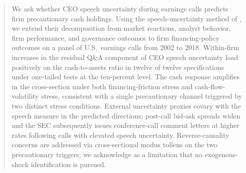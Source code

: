
\begin{abstract}
\noindent
We ask whether CEO speech uncertainty during earnings calls predicts firm precautionary cash holdings. Using the speech-uncertainty method of , we extend their decomposition from market reactions, analyst behavior, firm performance, and governance outcomes to firm financing-policy outcomes on a panel of U.S.\ earnings calls from 2002 to 2018. Within-firm increases in the residual Q\&A component of CEO speech uncertainty load positively on the cash-to-assets ratio in twelve of twelve specifications under one-tailed tests at the ten-percent level. The cash response amplifies in the cross-section under both financing-friction stress and cash-flow-volatility stress, consistent with a single precautionary channel triggered by two distinct stress conditions. External uncertainty proxies covary with the speech measure in the predicted directions; post-call bid-ask spreads widen and the SEC subsequently issues conference-call comment letters at higher rates following calls with elevated speech uncertainty. Reverse-causality concerns are addressed via cross-sectional modus tollens on the two precautionary triggers; we acknowledge as a limitation that no exogenous-shock identification is pursued.
\end{abstract}
